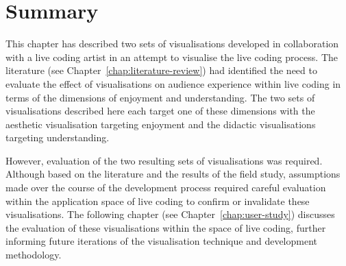 



\section{Summary}

This chapter has described two sets of visualisations developed in collaboration with a live coding artist in an attempt to visualise the live coding process. The literature (see Chapter~\ref{chap:literature-review}) had identified the need to evaluate the effect of visualisations on audience experience within live coding in terms of the dimensions of enjoyment and understanding. The two sets of visualisations described here each target one of these dimensions with the aesthetic visualisation targeting enjoyment and the didactic visualisations targeting understanding. 

However, evaluation of the two resulting sets of visualisations was required. Although based on the literature and the results of the field study, assumptions made over the course of the development process required careful evaluation within the application space of live coding to confirm or invalidate these visualisations. The following chapter (see Chapter~\ref{chap:user-study}) discusses the evaluation of these visualisations within the space of live coding, further informing future iterations of the visualisation technique and development methodology.



